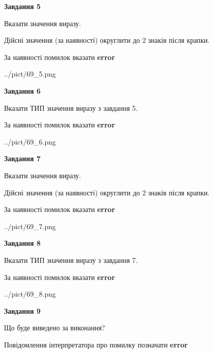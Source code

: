 \documentclass[11pt, ukrainian]{article}
\begin{document}
{\begin {large}
{\begin {center}\textbf{Завдання 5}\end {center}}\par
Вказати значення виразу. \par
Дійсні значення (за наявності) округлити до 2 знаків після крапки. \par
За наявності помилок вказати \textbf{error}

\begin{center}
	{../pict/69_5.png}
\end{center}
\newpage

{\begin {center}\textbf{Завдання 6}\end {center}}\par
Вказати ТИП значення виразу з завдання 5. \par
За наявності помилок вказати \textbf{error}

\begin{center}
	{../pict/69_6.png}
\end{center}
\newpage

{\begin {center}\textbf{Завдання 7}\end {center}}\par
Вказати значення виразу. \par
Дійсні значення (за наявності) округлити до 2 знаків після крапки. \par
За наявності помилок вказати \textbf{error}

\begin{center}
	{../pict/69_7.png}
\end{center}
\newpage

{\begin {center}\textbf{Завдання 8}\end {center}}\par
Вказати ТИП значення виразу з завдання 7. \par
За наявності помилок вказати \textbf{error}

\begin{center}
	{../pict/69_8.png}
\end{center}
\newpage

{\begin {center}\textbf{Завдання 9}\end {center}}\par
Що буде виведено за виконання? \par
Повідомлення інтерпретатора про помилку позначати \textbf{error}


\end{large}}
\end{document}
